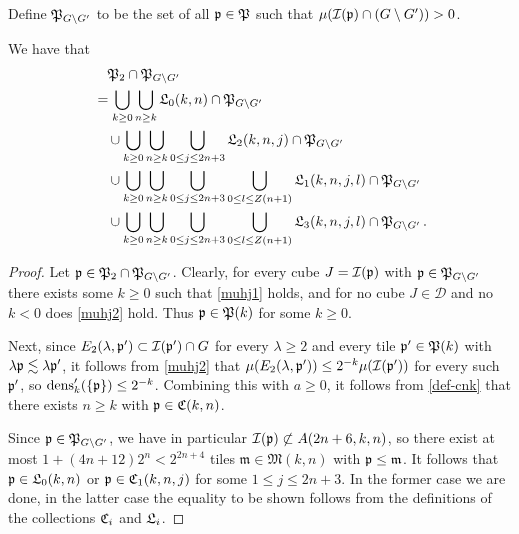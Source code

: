 Define ${\mathfrak P}_{G \setminus G'}$ to be the set of all ${\mathfrak p} \in {\mathfrak P}$ such that $\mu({\mathcal{I}}({\mathfrak p}) \cap (G \setminus  G')) > 0$.
\begin{lemma}
    \label{antichain-decomposition}
    \leanok
    We have that
    \begin{align}
        \label{eq-fp'-decomposition}
        &\quad {\mathfrak P}_2 \cap {\mathfrak P}_{G \setminus G'}\\
        &= \bigcup_{k \ge 0} \bigcup_{n \ge k} {\mathfrak L}_0(k,n) \cap {\mathfrak P}_{G \setminus G'} \\
        &\quad\cup \bigcup_{k \ge 0} \bigcup_{n \ge k}\bigcup_{0 \le j \le 2n+3} {\mathfrak L}_2(k,n,j) \cap {\mathfrak P}_{G \setminus G'}\\
        &\quad\cup \bigcup_{k \ge 0} \bigcup_{n \ge k}\bigcup_{0 \le j \le 2n+3} \bigcup_{0 \le l \le Z(n+1)} {\mathfrak L}_1(k,n,j,l) \cap {\mathfrak P}_{G \setminus G'}\\
        &\quad\cup \bigcup_{k \ge 0} \bigcup_{n \ge k}\bigcup_{0 \le j \le 2n+3} \bigcup_{0 \le l \le Z(n+1)} {\mathfrak L}_3(k,n,j,l)\cap {\mathfrak P}_{G \setminus G'}\,.
    \end{align}
\end{lemma}

\begin{proof}
    \leanok
    Let ${\mathfrak p} \in {\mathfrak P}_2 \cap {\mathfrak P}_{G \setminus G'}$. Clearly, for every cube $J = {\mathcal{I}}({\mathfrak p})$ with ${\mathfrak p} \in {\mathfrak P}_{G \setminus G'}$ there exists some $k \ge 0$ such that \eqref{muhj1} holds, and for no cube $J \in \mathcal{D}$ and no $k < 0$ does \eqref{muhj2} hold. Thus ${\mathfrak p} \in {\mathfrak P}(k)$ for some $k \ge 0$.

    Next, since $E_2(\lambda, {\mathfrak p}') \subset {\mathcal{I}}({\mathfrak p}')\cap G$ for every $\lambda \ge 2$ and every tile ${\mathfrak p}' \in {\mathfrak P}(k)$ with $\lambda{\mathfrak p} \lesssim \lambda {\mathfrak p}'$, it follows from \eqref{muhj2} that $\mu(E_2(\lambda, {\mathfrak p}')) \le 2^{-k} \mu({\mathcal{I}}({\mathfrak p}'))$ for every such ${\mathfrak p}'$, so $\operatorname{\operatorname{dens}}_k'(\{{\mathfrak p}\}) \le 2^{-k}$. Combining this with $a \ge 0$, it follows from \eqref{def-cnk} that there exists $n\ge k$ with ${\mathfrak p} \in {\mathfrak C}(k,n)$.

    Since ${\mathfrak p} \in {\mathfrak P}_{G \setminus G'}$, we have in particular ${\mathcal{I}}({\mathfrak p}) \not \subset A(2n + 6, k, n)$, so there exist at most $1 + (4n + 12)2^n < 2^{2n+4}$ tiles $\mathfrak{m} \in \mathfrak{M}(k,n)$ with ${\mathfrak p} \le \mathfrak{m}$. It follows that ${\mathfrak p} \in {\mathfrak L}_0(k,n)$ or ${\mathfrak p} \in {\mathfrak C}_1(k,n,j)$ for some $1 \le j \le 2n + 3$. In the former case we are done, in the latter case the equality to be shown follows from the definitions of the collections ${\mathfrak C}_i$ and ${\mathfrak L}_i$.
\end{proof}

